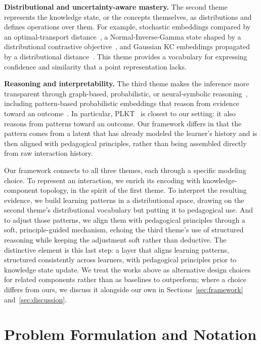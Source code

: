 \documentclass[conference]{IEEEtran}
\begin{document}
\textbf{Distributional and uncertainty-aware mastery.} The second theme represents the knowledge state, or the concepts themselves, as distributions and defines operations over them. For example, stochastic embeddings compared by an optimal-transport distance~\cite{chen2025ukt}, a Normal-Inverse-Gamma state shaped by a distributional contrastive objective~\cite{li2025keenkt}, and Gaussian KC embeddings propagated by a distributional distance~\cite{wu2026sskt}. This theme provides a vocabulary for expressing confidence and similarity that a point representation lacks.

\textbf{Reasoning and interpretability.} The third theme makes the inference more transparent through graph-based, probabilistic, or neural-symbolic reasoning~\cite{nakagawa2019gkt, zhou2024psikt, hooshyar2026nskt, wu2026plkt}, including pattern-based probabilistic embeddings that reason from evidence toward an outcome~\cite{wu2026plkt}. In particular, PLKT~\cite{wu2026plkt} is closest to our setting: it also reasons from patterns toward an outcome. Our framework differs in that the pattern comes from a latent that has already modeled the learner's history and is then aligned with pedagogical principles, rather than being assembled directly from raw interaction history.

Our framework connects to all three themes, each through a specific modeling choice. To represent an interaction, we enrich its encoding with knowledge-component topology, in the spirit of the first theme. To interpret the resulting evidence, we build learning patterns in a distributional space, drawing on the second theme's distributional vocabulary but putting it to pedagogical use. And to adjust those patterns, we align them with pedagogical principles through a soft, principle-guided mechanism, echoing the third theme's use of structured reasoning while keeping the adjustment soft rather than deductive. The distinctive element is this last step: a layer that aligns learning patterns, structured consistently across learners, with pedagogical principles prior to knowledge state update. We treat the works above as alternative design choices for related components rather than as baselines to outperform; where a choice differs from ours, we discuss it alongside our own in Sections~\ref{sec:framework} and~\ref{sec:discussion}.

\section{Problem Formulation and Notation}
\label{sec:formulation}
\end{document}
